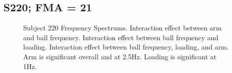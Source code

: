 \documentclass{article}
\begin{document}
\clearpage
\subsection{S220; FMA = 21}

\begin{figure}[!ht]
     \centering
     \hfill
     \hfill
	\caption{Subject 220 Frequency Spectrums. Interaction effect between arm and ball frequency. Interaction effect between ball frequency and loading. Interaction effect between ball frequency, loading, and arm. Arm is significant overall and at 2.5Hz. Loading is significant at 1Hz.}
\end{figure}
\end{document}
